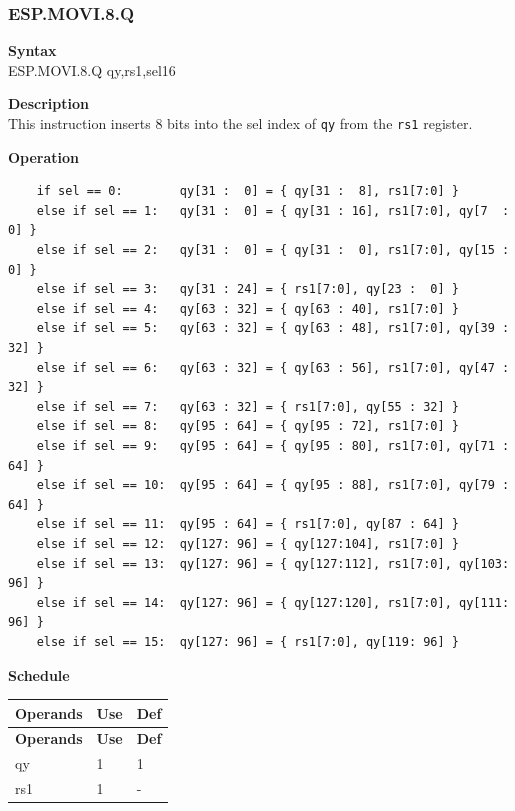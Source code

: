 \newpage
\subsubsection{ESP.MOVI.8.Q}\label{instruction:ESPMOVI8Q}
\textbf{Syntax}\\
ESP.MOVI.8.Q qy,rs1,sel16

\textbf{Description}\\
This instruction inserts 8 bits into the sel index of \lstinline{qy} from the \lstinline{rs1} register.

\textbf{Operation}\\
\begin{lstlisting}
    if sel == 0:        qy[31 :  0] = { qy[31 :  8], rs1[7:0] }
    else if sel == 1:   qy[31 :  0] = { qy[31 : 16], rs1[7:0], qy[7  :  0] }
    else if sel == 2:   qy[31 :  0] = { qy[31 :  0], rs1[7:0], qy[15 :  0] }
    else if sel == 3:   qy[31 : 24] = { rs1[7:0], qy[23 :  0] }
    else if sel == 4:   qy[63 : 32] = { qy[63 : 40], rs1[7:0] }
    else if sel == 5:   qy[63 : 32] = { qy[63 : 48], rs1[7:0], qy[39 : 32] }
    else if sel == 6:   qy[63 : 32] = { qy[63 : 56], rs1[7:0], qy[47 : 32] }
    else if sel == 7:   qy[63 : 32] = { rs1[7:0], qy[55 : 32] }
    else if sel == 8:   qy[95 : 64] = { qy[95 : 72], rs1[7:0] }
    else if sel == 9:   qy[95 : 64] = { qy[95 : 80], rs1[7:0], qy[71 : 64] }
    else if sel == 10:  qy[95 : 64] = { qy[95 : 88], rs1[7:0], qy[79 : 64] }
    else if sel == 11:  qy[95 : 64] = { rs1[7:0], qy[87 : 64] }
    else if sel == 12:  qy[127: 96] = { qy[127:104], rs1[7:0] }
    else if sel == 13:  qy[127: 96] = { qy[127:112], rs1[7:0], qy[103: 96] }
    else if sel == 14:  qy[127: 96] = { qy[127:120], rs1[7:0], qy[111: 96] }
    else if sel == 15:  qy[127: 96] = { rs1[7:0], qy[119: 96] }
\end{lstlisting}

\textbf{Schedule}\\
\begin{longtable}[c]{|l|l|l|}
    \hline
    \rowcolor{lightgray}
    \textbf{Operands} & \textbf{Use} & \textbf{Def} \\\hline
    \endfirsthead
    \hline
    \rowcolor{lightgray}
     \textbf{Operands} & \textbf{Use} & \textbf{Def} \\\hline
    \endhead
    \hline
    \endfoot

  qy & 1 & 1 \\\hline
    rs1 & 1 & -

\end{longtable}

